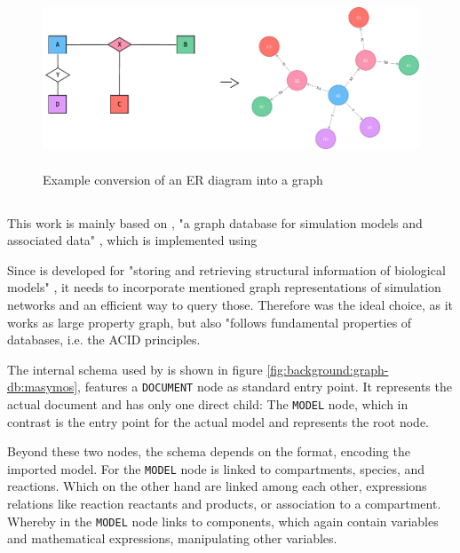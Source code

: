 \begin{figure}
	\center
	\includegraphics[height=150pt]{resources/er-to-neo4j.pdf}
	\caption{Example conversion of an ER diagram into a \neoj graph}
	
	
	\label{fig:example-er-diagram}
\end{figure}

\subsection{\masymos}
\label{sec:background:graph-db:masymos}

This work is mainly based on \masymos, "a graph database for simulation models and associated data" \cite{Henkel2015}, which is implemented using \neoj \cite{Robinson2013}

Since \masymos is developed for "storing and retrieving structural information of biological models" \cite{Henkel2015}, it needs to incorporate mentioned graph representations of simulation networks and an efficient way to query those. Therefore \neoj was the ideal choice, as it works as large property graph, but also "follows fundamental properties of databases, i.e. the ACID principles. \cite{Henkel2015}

The internal schema used by \masymos is shown in figure \ref{fig:background:graph-db:masymos}, features a \texttt{DOCUMENT} node as standard entry point. It represents the actual \xml document and has only one direct child: The \texttt{MODEL} node, which in contrast is the entry point for the actual model and represents the \xml root node.

Beyond these two nodes, the schema depends on the format, encoding the imported model. For \sbml the \texttt{MODEL} node is linked to compartments, species, and reactions. Which on the other hand are linked among each other, expressions relations like reaction reactants and products, or association to a compartment.
Whereby in \cellml the \texttt{MODEL} node links to components, which again contain variables and mathematical expressions, manipulating other variables.

